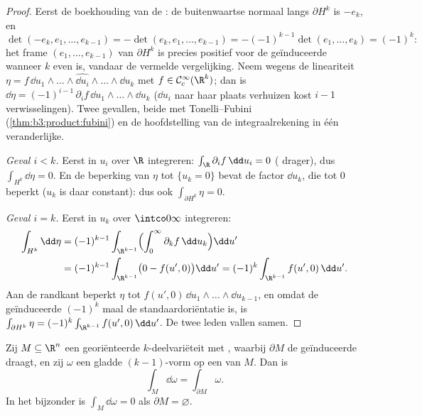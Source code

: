 \begin{proof}
Eerst de boekhouding van de : de buitenwaartse normaal
langs $\partial H^k$ is $-e_k$, en
\[
\det(-e_k, e_1, \dots, e_{k-1}) =
-\det(e_k, e_1, \dots, e_{k-1}) = -(-1)^{k-1}\det(e_1,
\dots, e_k) = (-1)^k :
\]
het frame $(e_1, \dots, e_{k-1})$ van $\partial H^k$ is precies
positief voor de geïnduceerde  wanneer $k$ even is,
vandaar de vermelde vergelijking. Neem wegens de lineariteit
$\eta = f\,\dd u_1\wedge\dots\wedge\widehat{\dd
u_i}\wedge\dots\wedge\dd u_k$ met $f \in \mathcal
C^\infty_c(\R^k)$; dan is $\dd\eta =
(-1)^{i-1}\,\partial_if\,\dd u_1\wedge\dots\wedge\dd u_k$ ($\dd
u_i$ naar haar plaats verhuizen kost $i - 1$ verwisselingen).
Twee gevallen, beide met Tonelli--Fubini
(\cref{thm:b3:product:fubini}) en de hoofdstelling van de
integraalrekening in één veranderlijke.

\emph{Geval $i < k$.} Eerst in $u_i$ over $\R$ integreren:
$\int_\R\partial_if\,\dd u_i = 0$ ( drager), dus
$\int_{H^k}\dd\eta = 0$. En de beperking van $\eta$ tot $\{u_k =
0\}$ bevat de factor $\dd u_k$, die tot $0$ beperkt ($u_k$ is
daar constant): dus ook $\int_{\partial H^k}\eta = 0$.

\emph{Geval $i = k$.} Eerst in $u_k$ over $\intco0\infty$
integreren:
\begin{align*}
\int_{H^k}\dd\eta &= (-1)^{k-1}\int_{\R^{k-1}}
\Bigl(\int_0^\infty\partial_kf\,\dd u_k\Bigr)\dd u' \\
&= (-1)^{k-1}\int_{\R^{k-1}}\bigl(0 - f(u', 0)\bigr)\dd u'
= (-1)^k\int_{\R^{k-1}}f(u',0)\,\dd u' .
\end{align*}
Aan de randkant beperkt $\eta$ tot $f(u', 0)\,\dd
u_1\wedge\dots\wedge\dd u_{k-1}$, en omdat de geïnduceerde
 $(-1)^k$ maal de standaardoriëntatie is, is
$\int_{\partial H^k}\eta = (-1)^k\int_{\R^{k-1}}f(u',0)\,\dd u'$.
De twee leden vallen samen.
\end{proof}

\begin{theorem}[Stokes]\label{thm:b3:forms:stokes}
Zij $M \subseteq \R^n$ een  georiënteerde
$k$-deelvariëteit met , waarbij $\partial M$ de geïnduceerde
 draagt, en zij $\omega$ een gladde $(k-1)$-vorm op een
 van $M$. Dan is
\[
\int_M\dd\omega = \int_{\partial M}\omega .
\]
In het bijzonder is $\int_M\dd\omega = 0$ als $\partial M =
\varnothing$.
\end{theorem}

